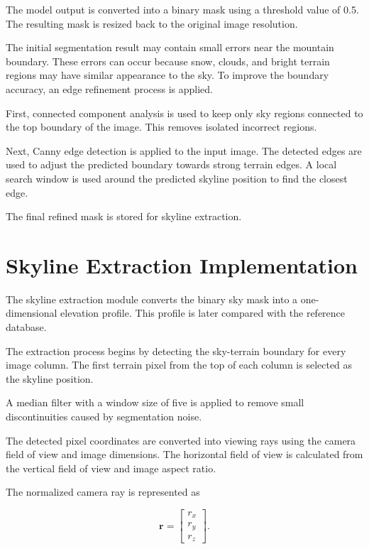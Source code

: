 The model output is converted into a binary mask using a threshold value of 0.5. The resulting mask is resized back to the original image resolution.

The initial segmentation result may contain small errors near the mountain boundary. These errors can occur because snow, clouds, and bright terrain regions may have similar appearance to the sky. To improve the boundary accuracy, an edge refinement process is applied.

First, connected component analysis is used to keep only sky regions connected to the top boundary of the image. This removes isolated incorrect regions.

Next, Canny edge detection is applied to the input image. The detected edges are used to adjust the predicted boundary towards strong terrain edges. A local search window is used around the predicted skyline position to find the closest edge.

The final refined mask is stored for skyline extraction.

\section{Skyline Extraction Implementation}

The skyline extraction module converts the binary sky mask into a one-dimensional elevation profile. This profile is later compared with the reference database.

The extraction process begins by detecting the sky-terrain boundary for every image column. The first terrain pixel from the top of each column is selected as the skyline position.

A median filter with a window size of five is applied to remove small discontinuities caused by segmentation noise.

The detected pixel coordinates are converted into viewing rays using the camera field of view and image dimensions. The horizontal field of view is calculated from the vertical field of view and image aspect ratio.

The normalized camera ray is represented as

\begin{equation}
\mathbf{r} =
\begin{bmatrix}
r_x\\
r_y\\
r_z
\end{bmatrix}.
\end{equation}

